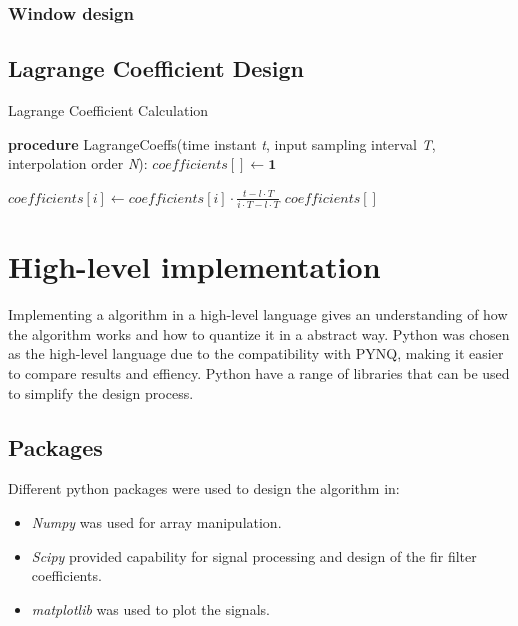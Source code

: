 \subsubsection{Window design}


\subsection{Lagrange Coefficient Design}

\begin{algorithm}
\caption{Lagrange Coefficient Calculation}\label{alg:main}
\begin{algorithmic}
\State \textbf{procedure} LagrangeCoeffs(time instant \textit{t}, input sampling interval \textit{T}, interpolation order \textit{N}):
\State $coefficients[] \gets \textbf{1}$

\State $coefficients[i] \gets coefficients[i] \cdot \frac{t - l \cdot T}{i \cdot T - l \cdot T}$
\EndIf
\EndFor
\EndFor
\State \Return $coefficients[]$
\end{algorithmic}
\end{algorithm}

\section{High-level implementation}
Implementing a algorithm in a high-level language gives an understanding of how the algorithm works and how to quantize it in a abstract way. Python was chosen as the high-level language due to the compatibility with PYNQ, making it easier to compare results and effiency. Python have a range of libraries that can be used to simplify the design process.

\subsection{Packages}
Different python packages were used to design the algorithm in: 
\begin{itemize}
    \item \textit{Numpy} was used for array manipulation.
    \item \textit{Scipy} provided capability for signal processing and design of the \acrshort{fir} filter coefficients.
    \item \textit{matplotlib} was used to plot the signals.
\end{itemize}


